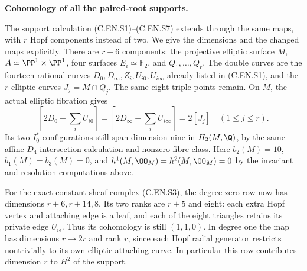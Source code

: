 \par\medskip\noindent\textbf{Cohomology of all the paired-root supports.}\par\noindent
The support calculation (C.EN.S1)--(C.EN.S7) extends through
the same maps, with $r$ Hopf components instead of two.
We give the dimensions and the changed maps explicitly.
There are $r+6$ components: the projective elliptic surface
$M$, $A\simeq\PP^1\times\PP^1$, four surfaces
$E_i\simeq\mathbb F_2$, and $Q_1,\ldots,Q_r$.
The double curves are the fourteen rational curves
$D_0,D_\infty,Z_i,U_{i0},U_{i\infty}$ already listed
in (C.EN.S1), and the $r$ elliptic curves
$J_j=M\cap Q_j$. The same eight triple points remain.
On $M$, the actual elliptic fibration gives
\[
 [2D_0+\textstyle\sum_iU_{i0}]
 =[2D_\infty+\textstyle\sum_iU_{i\infty}]
 =2[J_j]\quad(1\le j\le r).
                                                               \tag{C.EN.G1}
\]
Its two $I_0^*$ configurations still span dimension nine
in $H_2(M,\Q)$, by the same affine-$D_4$ intersection
calculation and nonzero fibre class. Here $b_2(M)=10$,
$b_1(M)=b_3(M)=0$, and $h^1(M,\OO_M)=h^2(M,\OO_M)=0$
by the invariant and resolution computations above.

For the exact constant-sheaf complex (C.EN.S3), the
degree-zero row now has dimensions
$r+6,r+14,8$. Its two ranks are $r+5$ and eight:
each extra Hopf vertex and attaching edge is a leaf,
and each of the eight triangles retains its private
edge $U_{i\epsilon}$. Thus its cohomology is still
$(1,1,0)$. In degree one the map has dimensions
$r\to2r$ and rank $r$, since each Hopf radial
generator restricts nontrivially to its own elliptic
attaching curve. In particular this row contributes
dimension $r$ to $H^2$ of the support.

